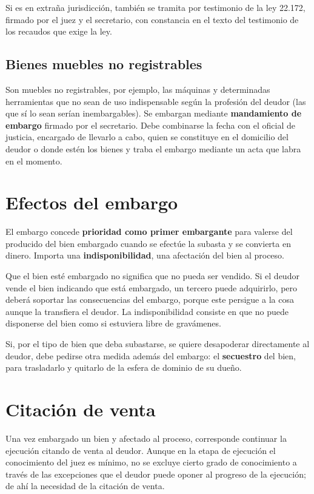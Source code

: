 \documentclass[12pt,oneside]{book}
\begin{document}
Si es en extraña jurisdicción, también se tramita por testimonio de la ley 22.172, firmado por el juez y el secretario, con constancia en el texto del testimonio de los recaudos que exige la ley.

\subsection{Bienes muebles no registrables}

Son muebles no registrables, por ejemplo, las máquinas y determinadas herramientas que no sean de uso indispensable según la profesión del deudor (las que sí lo sean serían inembargables). Se embargan mediante \textbf{mandamiento de embargo} firmado por el secretario. Debe combinarse la fecha con el oficial de justicia, encargado de llevarlo a cabo, quien se constituye en el domicilio del deudor o donde estén los bienes y traba el embargo mediante un acta que labra en el momento.

\section{Efectos del embargo}

El embargo concede \textbf{prioridad como primer embargante} para valerse del producido del bien embargado cuando se efectúe la subasta y se convierta en dinero. Importa una \textbf{indisponibilidad}, una afectación del bien al proceso.

\begin{important}
Que el bien esté embargado no significa que no pueda ser vendido. Si el deudor vende el bien indicando que está embargado, un tercero puede adquirirlo, pero deberá soportar las consecuencias del embargo, porque este persigue a la cosa aunque la transfiera el deudor. La indisponibilidad consiste en que no puede disponerse del bien como si estuviera libre de gravámenes.
\end{important}

Si, por el tipo de bien que deba subastarse, se quiere desapoderar directamente al deudor, debe pedirse otra medida además del embargo: el \textbf{secuestro} del bien, para trasladarlo y quitarlo de la esfera de dominio de su dueño.

\section{Citación de venta}

Una vez embargado un bien y afectado al proceso, corresponde continuar la ejecución citando de venta al deudor. Aunque en la etapa de ejecución el conocimiento del juez es mínimo, no se excluye cierto grado de conocimiento a través de las excepciones que el deudor puede oponer al progreso de la ejecución; de ahí la necesidad de la citación de venta.
\end{document}
